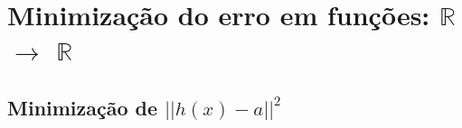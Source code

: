 
\chapter{Minimização do erro em funções: $\mathbb{R}$ $\rightarrow$ $\mathbb{R}$}

\section{Minimização de $||h(x)-a||^2$} 

